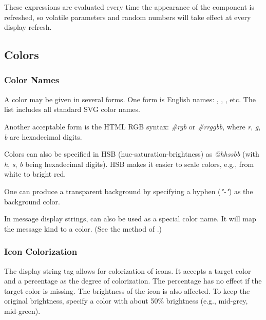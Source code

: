 
These expressions are evaluated every time the appearance of the component is refreshed,
so volatile parameters and random numbers will take effect at every display refresh.


\subsection{Colors}
\label{sec:graphics:displaystring-colors}

\subsubsection{Color Names}
\label{sec:graphics:displaystring-color-names}

A color may be given in several forms. One form is English names: ,
, , etc. The list includes all standard SVG color
names.

Another acceptable form is the HTML RGB syntax: \textit{\#rgb} or
\textit{\#rrggbb}, where \textit{r}, \textit{g}, \textit{b} are hexadecimal
digits.

Colors can also be specified in HSB (hue-saturation-brightness) as
\textit{@hhssbb} (with \textit{h}, \textit{s}, \textit{b} being hexadecimal
digits). HSB makes it easier to scale colors, e.g., from white to bright red.

One can produce a transparent background by specifying a hyphen (\textit{"-"})
as the background color.

In message display strings,  can also be used as a special color name.
It will map the message kind to a color. (See the  method of
.)

\subsubsection{Icon Colorization}
\label{sec:graphics:displaystring-icon-colorization}

The  display string tag allows for colorization of icons. It accepts a
target color and a percentage as the degree of colorization. The percentage has
no effect if the target color is missing. The brightness of the icon is also
affected. To keep the original brightness, specify a color with about 50\%
brightness (e.g.,  mid-grey,  mid-green).


